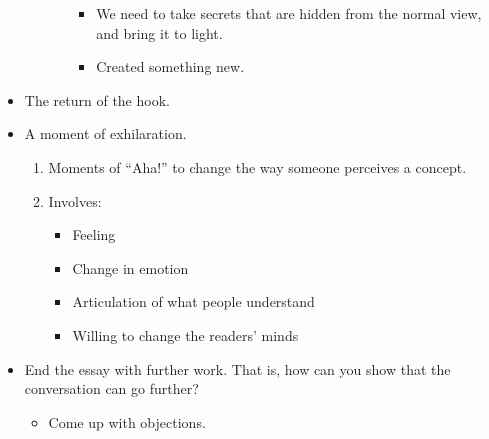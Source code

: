 \documentclass[11pt]{article}
\begin{document}
\begin{itemize}
\begin{itemize}
\begin{itemize}
\begin{itemize}
                \item We need to take secrets that are hidden from the normal view, and bring it to light.
                \item Created something new.
            \end{itemize}
        \end{itemize}
    \end{itemize}
    \item The return of the hook. 
    \item A moment of exhilaration.
    \begin{enumerate}
        \item Moments of ``Aha!'' to change the way someone perceives a concept.
        \item Involves:
        \begin{itemize}
            \item Feeling
            \item Change in emotion
            \item Articulation of what people understand
            \item Willing to change the readers' minds
        \end{itemize}
    \end{enumerate}
    \item End the essay with further work. That is, how can you show that the conversation can go further?
    \begin{itemize}
        \item Come up with objections.
    \end{itemize}
\end{itemize}
\end{document}
